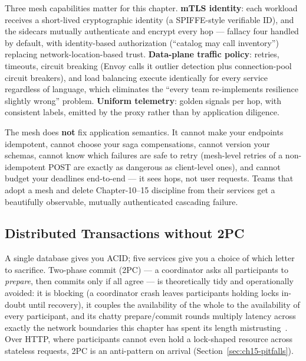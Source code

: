 Three mesh capabilities matter for this chapter. \textbf{mTLS identity}:
each workload receives a short-lived cryptographic identity (a SPIFFE-style
verifiable ID), and the sidecars mutually authenticate and encrypt every
hop --- fallacy four handled by default, with identity-based authorization
(``catalog may call inventory'') replacing network-location-based trust.
\textbf{Data-plane traffic policy}: retries, timeouts, circuit breaking
(Envoy calls it outlier detection plus connection-pool circuit breakers),
and load balancing execute identically for every service regardless of
language, which eliminates the ``every team re-implements resilience
slightly wrong'' problem. \textbf{Uniform telemetry}: golden signals per
hop, with consistent labels, emitted by the proxy rather than by
application diligence.

\begin{warningbox}
The mesh does \textbf{not} fix application semantics. It cannot make your
endpoints idempotent, cannot choose your saga compensations, cannot version
your schemas, cannot know which failures are safe to retry (mesh-level
retries of a non-idempotent POST are exactly as dangerous as client-level
ones), and cannot budget your deadlines end-to-end --- it sees hops, not
user requests. Teams that adopt a mesh and delete Chapter-10--15 discipline
from their services get a beautifully observable, mutually authenticated
cascading failure.
\end{warningbox}

\subsection{Distributed Transactions without 2PC}
\label{subsec:ch15-transactions}

A single database gives you ACID; five services give you a choice of which
letter to sacrifice. Two-phase commit (2PC) --- a coordinator asks all
participants to \emph{prepare}, then commits only if all agree --- is
theoretically tidy and operationally avoided: it is blocking (a coordinator
crash leaves participants holding locks in-doubt until recovery), it
couples the availability of the whole to the availability of every
participant, and its chatty prepare/commit rounds multiply latency across
exactly the network boundaries this chapter has spent its length
mistrusting~\cite{kleppmann2017ddia}. Over HTTP, where participants cannot
even hold a lock-shaped resource across stateless requests, 2PC is an
anti-pattern on arrival (Section~\ref{sec:ch15-pitfalls}).

